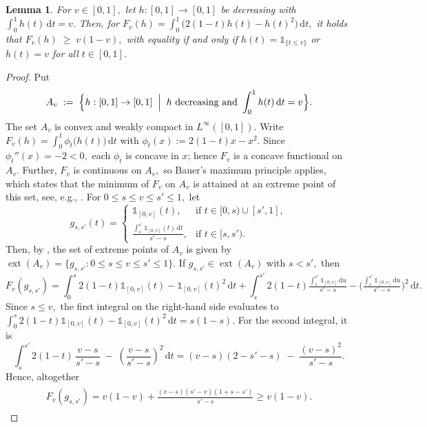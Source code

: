 \documentclass{article}
\theoremstyle{plain}
\newtheorem{lemma}{Lemma}
\theoremstyle{definition}
\def\1{\mathds{1}} %
\newcommand{\de}{\mathrm{\,d}}
\begin{document}
\begin{lemma}\label{lem:fanlorentz_ineq}
For \(v\in [0,1],\) let $h:[0,1]\rightarrow[0,1]$ be decreasing with $\int_{0}^{1}h(t)\de t= v.$
Then, for $F_v(h) = \int_{0}^{1}\!\bigl(2(1-t)h(t)-h(t)^2\bigr)\de t,$ it holds that
\(
  F_v(h)\;\ge\;v(1-v)
,\)
with equality if and only if $h(t)=\1_{\{t\le v\}}$ or $h(t)=v$ for all \(t\in [0,1].\)
\end{lemma}

\begin{proof}
Put
\[
    A_v\;:=\;\Bigl\{h:[0,1]\to[0,1]\;\Bigm|\;
         h\text{ decreasing and }\int_{0}^{1}h(t)\de t = v \Bigr\}.
\]
The set $A_v$ is convex and weakly compact in $L^\infty([0,1]).$
Write $F_v(h)=\int_{0}^{1}\phi_t\!\bigl(h(t)\bigr)\de t$ with
\(
    \phi_t(x) := 2(1-t)x-x^{2}
.\)
Since $\phi_t''(x)=-2<0,$ each $\phi_t$ is concave in $x$; hence $F_v$ is a concave functional on $A_v.$
Further, $F_v$ is continuous on $A_v,$ so Bauer's maximum principle applies, which states that the minimum of $F_v$ on $A_v$ is attained at an extreme point of this set, see, e.g., \cite[Theorem~16.6]{phelps2002lectures}.
For $0\le s \le v \le s' \le 1,$ let
\[
  g_{s,s'}(t) = \begin{cases}
    \1_{[0,v]}(t), & \text{if } t\in[0,s)\cup[s',1], \\
    \frac{\int_s^{s'} \1_{[0, v]}(t) \de t}{s'-s}, & \text{if } t\in [s,s').
  \end{cases}
\]
Then, by \cite[Theorem 1]{kleiner2021extreme}, the set of extreme points of $A_v$ is given by
\(
  \operatorname{ext}(A_v) = \{g_{s,s'} : 0\le s \le v \le s' \le 1\} 
.\)
If $g_{s,s'} \in \operatorname{ext}(A_v)$ with $s<s',$ then
\[
  F_v(g_{s,s'})
  = \int_0^{s} 2(1-t)\1_{[0,v]}(t) - \1_{[0,v]}(t)^2 \de t + \int_s^{s'} 2(1-t)\tfrac{\int_s^{s'} \1_{[0, v]} \de u}{s'-s} - \big(\tfrac{\int_s^{s'} \1_{[0, v]} \de u}{s'-s}\big)^2 \de t
.\]
Since $s\le v,$ the first integral on the right-hand side evaluates to
\(
    \int_0^{s} 2(1-t)\1_{[0,v]}(t) - \1_{[0,v]}(t)^2 \de t
    =s(1-s).
\)
For the second integral, it is
\[
\int_s^{s'} \! 2(1-t)\,\frac{v-s}{s'-s} 
  \;-\;\left(\frac{v-s}{s'-s}\right)^2\de t
= (v-s)\left(2 - s' - s\right)
  \;-\;\frac{(v-s)^2}{s'-s}.
\]
Hence, altogether
\begin{align}
  \label{eq:extreme_point_F_v}
  \begin{aligned}
  F_v(g_{s,s'})
  = v(1-v)  + \frac{(v - s)(s' - v)(1 + s - s')}{s' - s}
  \ge v(1-v)
  .\end{aligned}
\end{align}

\end{proof}
\end{document}
